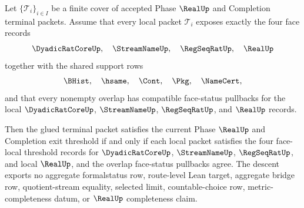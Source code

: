 \begin{theorem}
\label{thm:real-l10-finite-cover-status-threshold-descent}
Let $\{\mathcal T_i\}_{i \in I}$ be a finite cover of accepted Phase $\RealUp$ and Completion terminal packets. Assume that every local packet $\mathcal T_i$ exposes exactly the four face records
$$
\DyadicRatCoreUp,\quad \StreamNameUp,\quad \RegSeqRatUp,\quad \RealUp
$$
together with the shared support rows
$$
\BHist,\quad \hsame,\quad \Cont,\quad \Pkg,\quad \NameCert,
$$
and that every nonempty overlap has compatible face-status pullbacks for the local $\DyadicRatCoreUp$, $\StreamNameUp$, $\RegSeqRatUp$, and $\RealUp$ records.

Then the glued terminal packet satisfies the current Phase $\RealUp$ and Completion exit threshold if and only if each local packet satisfies the four face-local threshold records for $\DyadicRatCoreUp$, $\StreamNameUp$, $\RegSeqRatUp$, and local $\RealUp$, and the overlap face-status pullbacks agree. The descent exports no aggregate formalstatus row, route-level Lean target, aggregate bridge row, quotient-stream equality, selected limit, countable-choice row, metric-completeness datum, or $\RealUp$ completeness claim.
\end{theorem}
